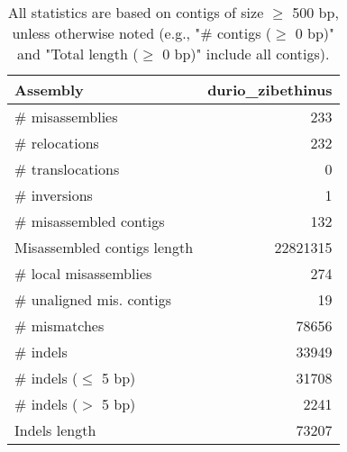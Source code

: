 \documentclass[12pt,a4paper]{article}
\begin{document}
\begin{table}[ht]
\begin{center}
\caption{All statistics are based on contigs of size $\geq$ 500 bp, unless otherwise noted (e.g., "\# contigs ($\geq$ 0 bp)" and "Total length ($\geq$ 0 bp)" include all contigs).}
\begin{tabular}{|l*{1}{|r}|}
\hline
Assembly & durio\_zibethinus \\ \hline
\# misassemblies & 233 \\ \hline
\hspace{5mm}\# relocations & 232 \\ \hline
\hspace{5mm}\# translocations & 0 \\ \hline
\hspace{5mm}\# inversions & 1 \\ \hline
\# misassembled contigs & 132 \\ \hline
Misassembled contigs length & 22821315 \\ \hline
\# local misassemblies & 274 \\ \hline
\# unaligned mis. contigs & 19 \\ \hline
\# mismatches & 78656 \\ \hline
\# indels & 33949 \\ \hline
\hspace{5mm}\# indels ($\leq$ 5 bp) & 31708 \\ \hline
\hspace{5mm}\# indels ($>$ 5 bp) & 2241 \\ \hline
Indels length & 73207 \\ \hline
\end{tabular}
\end{center}
\end{table}
\end{document}
